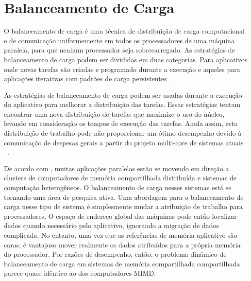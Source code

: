 \section{Balanceamento de Carga}

O balanceamento de carga é uma técnica de distribuição de carga computacional e de comunicação uniformemente em todos os processadores de uma máquina paralela, para que nenhum processador seja sobrecarregado. As estratégias de balanceamento de carga podem ser divididas em duas categorias. Para aplicativos onde novas tarefas são criadas e programado durante a execução e aqueles para aplicações iterativas com padrões de carga persistentes~\cite{zheng2010}.

As estratégias de balanceamento de carga podem ser usadas durante a execução do aplicativo para melhorar a distribuição das tarefas. Essas estratégias tentam encontrar uma nova distribuição de tarefas que maximize o uso do núcleo, levando em consideração os tempos de execução das tarefas. Ainda assim, esta distribuição de trabalho pode não proporcionar um ótimo desempenho devido à comunicação de despesas gerais a partir do projeto multi-core de sistemas atuais ~\cite{pilla2014topology}.

De acordo com \cite{hendrickson2000dynamic}, muitas aplicações paralelas estão se movendo em direção a clusters de computadores de memória compartilhada distribuída e sistemas de computação heterogêneos. O balanceamento de carga nesses sistemas está se tornando uma área de pesquisa ativa. Uma abordagem para o balanceamento de carga nesse tipo de sistema é simplesmente mudar a atribuição de trabalho para processadores. O espaço de endereço global das máquinas pode então localizar dados quando necessário pelo aplicativo, ignorando a migração de dados complicada. No entanto, uma vez que as referências de memória aplicativo são caras, é vantajoso mover realmente os dados atribuídos para a própria memória do processador. Por razões de desempenho, então, o problema dinâmico de balanceamento de carga em sistemas de memória compartilhada compartilhada parece quase idêntico ao dos computadores MIMD. 